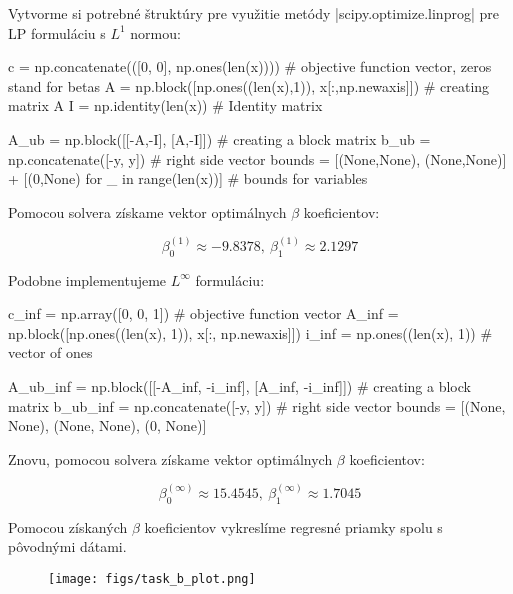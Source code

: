 \documentclass[report.tex]{subfiles}
\begin{document}
\newpage

Vytvorme si potrebné štruktúry pre využitie metódy \pyth|scipy.optimize.linprog| pre LP formuláciu s $L^1$ normou:

\begin{python}
c = np.concatenate(([0, 0], np.ones(len(x))))   # objective function vector, zeros stand for betas
A = np.block([np.ones((len(x),1)), x[:,np.newaxis]]) # creating matrix A
I = np.identity(len(x))     # Identity matrix

A_ub = np.block([[-A,-I], [A,-I]])      # creating a block matrix 
b_ub = np.concatenate([-y, y])          # right side vector
bounds = [(None,None), (None,None)] + [(0,None) for _ in range(len(x))] # bounds for variables
\end{python}

Pomocou solvera získame vektor optimálnych $\beta$ koeficientov:

\begin{equation*}
	\beta_0^{(1)} \approx -9.8378,~\beta_1^{(1)} \approx 2.1297
\end{equation*}

Podobne implementujeme $L^{\infty}$ formuláciu:

\begin{python}
c_inf = np.array([0, 0, 1])       # objective function vector
A_inf = np.block([np.ones((len(x), 1)), x[:, np.newaxis]])
i_inf = np.ones((len(x), 1))    # vector of ones

A_ub_inf = np.block([[-A_inf, -i_inf], [A_inf, -i_inf]]) # creating a block matrix
b_ub_inf = np.concatenate([-y, y]) # right side vector
bounds = [(None, None), (None, None), (0, None)]
\end{python}

Znovu, pomocou solvera získame vektor optimálnych $\beta$ koeficientov:

\begin{equation*}
	\beta_0^{(\infty)} \approx 15.4545,~\beta_1^{(\infty)} \approx 1.7045
\end{equation*}

Pomocou získaných $\beta$ koeficientov vykreslíme regresné priamky spolu s pôvodnými dátami.

\begin{figure}[h!]
	\centering
	\texttt{[image: figs/task\_b\_plot.png]}
\end{figure}
\end{document}
